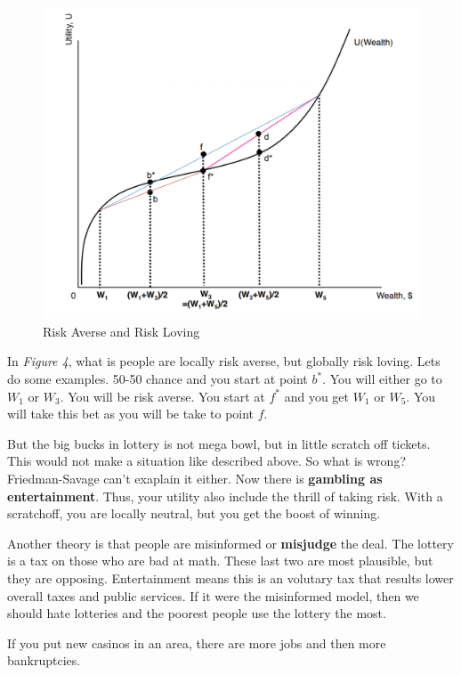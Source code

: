 \documentclass{article}
\begin{document}
\begin{figure}[H]
    \centering
    \includegraphics[scale=0.60]{"Risk Averse and Risk Loving"}
    \caption{Risk Averse and Risk Loving}
\end{figure}

In \textit{Figure 4}, what is people are locally risk averse, but globally risk
loving. Lets do some examples. 50-50 chance and you start at point $b^*$. You
will either go to $W_1$ or $W_3$. You will be risk averse. You start at $f^*$
and you get $W_1$ or $W_5$. You will take this bet as you will be take to point
$f$.

But the big bucks in lottery is not mega bowl, but in little scratch off
tickets. This would not make a situation like described above. So what is wrong?
Friedman-Savage can't exaplain it either. Now there is \textbf{gambling as
entertainment}. Thus, your utility also include the thrill of taking risk. With
a scratchoff, you are locally neutral, but you get the boost of winning.

Another theory is that people are misinformed or \textbf{misjudge} the deal. The
lottery is a tax on those who are bad at math. These last two are most
plausible, but they are opposing. Entertainment means this is an volutary tax
that results lower overall taxes and public services. If it were the misinformed
model, then we should hate lotteries and the poorest people use the lottery the
most. 

If you put new casinos in an area, there are more jobs and then more
bankruptcies.
\end{document}
